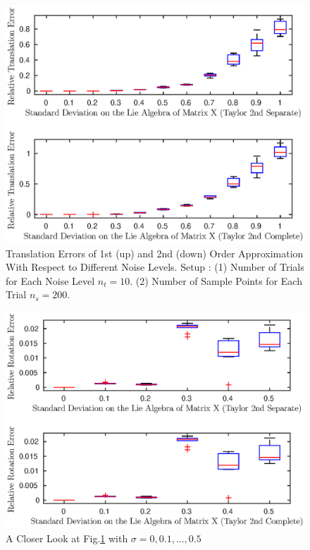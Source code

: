 \documentclass[twocolumn,10pt]{asme2ej}
\begin{document}
\begin{figure}[h]\label{mean_conv_approx_tran}
\includegraphics[scale = 0.60]{Mean_Definition_Figures/mean_conv_trans_rel_10.eps}
\caption{Translation Errors of 1st (up) and 2nd (down) Order Approximation With Respect to Different Noise Levels. Setup : (1) Number of Trials for Each Noise Level $n_t = 10$. (2) Number of Sample Points for Each Trial $n_s = 200$. }
\centering
\end{figure}

\begin{figure}[h]\label{mean_conv_approx_tran_close}
\includegraphics[scale = 0.60]{Mean_Definition_Figures/mean_conv_rot_rel_5.eps}
\caption{A Closer Look at Fig.\ref{mean_conv_approx_tran} with $\sigma = 0, 0.1, ... , 0.5$}
\centering
\end{figure}
\end{document}
